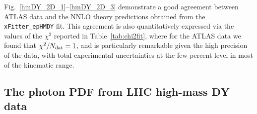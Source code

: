 Fig.~\ref{hmDY_2D_1}--\ref{hmDY_2D_3} demonstrate
a good agreement between ATLAS data and the NNLO theory
predictions obtained from the {\tt xFitter\_epHMDY} fit.
%
This agreement is also quantitatively expressed via the values of the $\chi^2$ reported in
Table~\ref{tab:chi2fit}, where for the ATLAS data we found
that $\chi^2/N_{\rm dat}=1$, and is particularly remarkable
given the high precision of the data, with total experimental
uncertainties at the few percent level in most of the kinematic range.

\subsection{The photon PDF from LHC high-mass DY data}


